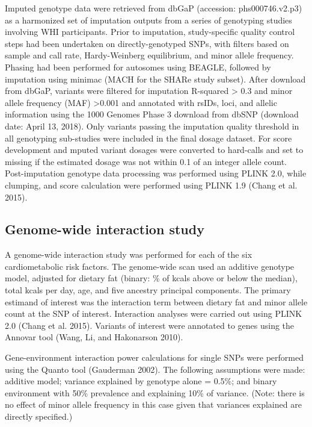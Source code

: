 \documentclass[]{article}
\begin{document}
Imputed genotype data were retrieved from dbGaP (accession:
phs000746.v2.p3) as a harmonized set of imputation outputs from a series
of genotyping studies involving WHI participants. Prior to imputation,
study-specific quality control steps had been undertaken on
directly-genotyped SNPs, with filters based on sample and call rate,
Hardy-Weinberg equilibrium, and minor allele frequency. Phasing had been
performed for autosomes using BEAGLE, followed by imputation using
minimac (MACH for the SHARe study subset). After download from dbGaP,
variants were filtered for imputation R-squared \textgreater{} 0.3 and
minor allele frequency (MAF) \textgreater{}0.001 and annotated with
rsIDs, loci, and allelic information using the 1000 Genomes Phase 3
download from dbSNP (download date: April 13, 2018). Only variants
passing the imputation quality threshold in all genotyping sub-studies
were included in the final dosage dataset. For score development and
mputed variant dosages were converted to hard-calls and set to missing
if the estimated dosage was not within 0.1 of an integer allele count.
Post-imputation genotype data processing was performed using PLINK 2.0,
while clumping, and score calculation were performed using PLINK 1.9
(Chang et al. 2015).

\hypertarget{genome-wide-interaction-study}{%
\subsection{Genome-wide interaction
study}\label{genome-wide-interaction-study}}

A genome-wide interaction study was performed for each of the six
cardiometabolic risk factors. The genome-wide scan used an additive
genotype model, adjusted for dietary fat (binary: \% of kcals above or
below the median), total kcals per day, age, and five ancestry principal
components. The primary estimand of interest was the interaction term
between dietary fat and minor allele count at the SNP of interest.
Interaction analyses were carried out using PLINK 2.0 (Chang et al.
2015). Variants of interest were annotated to genes using the Annovar
tool (Wang, Li, and Hakonarson 2010).

Gene-environment interaction power calculations for single SNPs were
performed using the Quanto tool (Gauderman 2002). The following
assumptions were made: additive model; variance explained by genotype
alone = 0.5\%; and binary environment with 50\% prevalence and
explaining 10\% of variance. (Note: there is no effect of minor allele
frequency in this case given that variances explained are directly
specified.)
\end{document}
